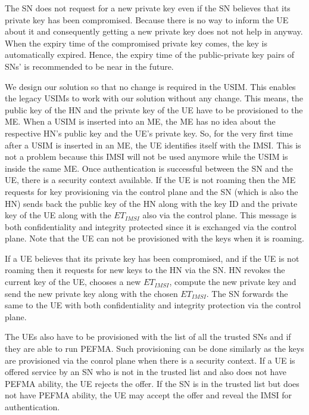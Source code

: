 \documentclass{river-journal}
\begin{document}
The SN does not request for a new private key even if the SN believes that its private key has been compromised. Because there is no way to inform the UE about it and consequently getting a new private key does not not help in anyway. When the expiry time of the compromised private key comes, the key is automatically expired. Hence, the expiry time of the public-private key pairs of SNs' is recommended to be near in the future.

We design our solution so that no change is required in the USIM. This enables the legacy USIMs to work with our solution without any change. This means, the public key of the HN and the private key of the UE have to be provisioned to the ME. When a USIM is inserted into an ME, the ME has no idea about the respective HN's public key and the UE's private key. So, for the very first time after a USIM is inserted in an ME, the UE identifies itself with the IMSI. This is not a problem because this IMSI will not be used anymore while the USIM is inside the same ME. Once authentication is successful between the SN and the UE, there is a security context available. If the UE is not roaming then the ME requests for key provisioning via the control plane and the SN (which is also the HN) sends back the public key of the HN along with the key ID and the private key of the UE along with the $ET_{IMSI}$ also via the control plane. This message is both confidentiality and integrity protected since it is exchanged via the control plane. Note that the UE can not be provisioned with the keys when it is roaming.

If a UE believes that its private key has been compromised, and if the UE is not roaming then it requests for new keys to the HN via the SN. HN revokes the current key of the UE, chooses a new $ET_{IMSI}$, compute the new private key and send the new private key along with the chosen $ET_{IMSI}$. The SN forwards the same to the UE with both confidentiality and integrity protection via the control plane.

The UEs also have to be provisioned with the list of all the trusted SNs and if they are able to run PEFMA. Such provisioning can be done similarly as the keys are provisioned via the conrol plane when there is a security context. If a UE is offered service by an SN who is not in the trusted list and also does not have PEFMA ability, the UE rejects the offer. If the SN is in the trusted list but does not have PEFMA ability, the UE may accept the offer and reveal the IMSI for authentication.
\end{document}
